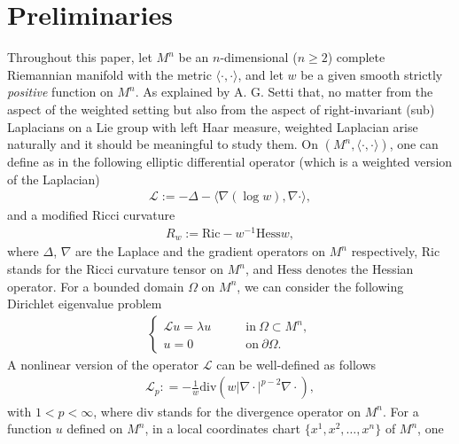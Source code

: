 \documentclass[12pt]{article}
\begin{document}
\section{Preliminaries} \label{sect2}
\renewcommand{\thesection}{\arabic{section}}
\renewcommand{\theequation}{\thesection.\arabic{equation}}
\setcounter{equation}{0}

Throughout this paper, let $M^{n}$ be an $n$-dimensional ($n\geq2$)
complete Riemannian manifold with the metric
$\langle\cdot,\cdot\rangle$, and let $w$ be a given smooth strictly
\emph{positive} function on $M^{n}$. As explained by A. G. Setti
\cite[Section 1]{SAG} that, no matter from the aspect of the
weighted setting but also from the aspect of  right-invariant (sub)
Laplacians on a Lie group with left Haar measure, weighted Laplacian
arise naturally and it should be meaningful to study them. On
$(M^{n}, \langle\cdot,\cdot\rangle)$, one can define as in
\cite{SAG} the following elliptic differential operator (which is a
weighted version of the Laplacian)
\begin{eqnarray*}
\mathcal{L}:= -\Delta - \langle \nabla(\log w), \nabla \cdot
\rangle,
\end{eqnarray*}
and a modified Ricci curvature
\begin{eqnarray*}
R_{w}:=\mathrm{Ric}-w^{-1}\mathrm{Hess}w,
\end{eqnarray*}
where $\Delta$, $\nabla$ are the Laplace and the gradient operators
on $M^{n}$ respectively, $\mathrm{Ric}$ stands for the Ricci
curvature tensor on $M^{n}$, and $\mathrm{Hess}$ denotes the Hessian
operator. For a bounded domain $\Omega$ on $M^{n}$, we can consider
the following Dirichlet eigenvalue problem
\begin{eqnarray} \label{eigenp-1}
\left\{
\begin{array}{ll}
\mathcal{L}u=\lambda u  \qquad & \mathrm{in}~\Omega\subset M^n,\\
u=0\qquad & \mathrm{on}~\partial\Omega.
\end{array}
\right.
\end{eqnarray}
A nonlinear version of the operator $\mathcal{L}$ can be
well-defined as follows
\begin{eqnarray*}
\mathcal{L}_{p}: = -\frac{1}{w} \mathrm{div}\left(w |\nabla
\cdot|^{p-2} \nabla\cdot \right),
\end{eqnarray*}
with $1<p<\infty$, where $\mathrm{div}$ stands for the divergence
operator on $M^n$. For a function $u$ defined on $M^{n}$, in a local
coordinates chart  $\{x^1, x^2, \ldots, x^n\}$ of $M^{n}$,   one
\end{document}
